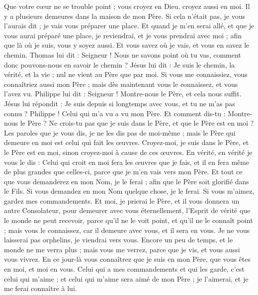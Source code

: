 \begin{multicols}{2}
\VerseOne{}Que votre cœur ne se trouble point ; vous croyez en Dieu, croyez aussi en moi.
Il y a plusieurs demeures dans la maison de mon Père. Si cela n'était pas, je vous l'aurais dit ; je vais vous préparer une place.
Et quand je m'en serai allé, et que je vous aurai préparé une place, je reviendrai, et je vous prendrai avec moi ; afin que là où je suis, vous y soyez aussi.
Et vous savez où je vais, et vous en savez le chemin.
Thomas lui dit : Seigneur ! Nous ne savons point où tu vas, comment donc pouvons-nous en savoir le chemin ?
Jésus lui dit : Je suis le chemin, la vérité, et la vie ; nul ne vient au Père que par moi.
Si vous me connaissiez, vous connaîtriez aussi mon Père ; mais dès maintenant vous le connaissez, et vous l'avez vu.
Philippe lui dit : Seigneur ! Montre-nous le Père, et cela nous suffit.
Jésus lui répondit : Je suis depuis si longtemps avec vous, et tu ne m'as pas connu ? Philippe ! Celui qui m'a vu a vu mon Père. Et comment dis-tu : Montre-nous le Père ?
Ne crois-tu pas que je suis dans le Père, et que le Père est en moi ? Les paroles que je vous dis, je ne les dis pas de moi-même ; mais le Père qui demeure en moi est celui qui fait les œuvres.
Croyez-moi, je suis dans le Père, et le Père est en moi, sinon croyez-moi à cause de ces œuvres.
En vérité, en vérité je vous le dis : Celui qui croit en moi fera les œuvres que je fais, et il en fera même de plus grandes que celles-ci, parce que je m'en vais vers mon Père.
Et tout ce que vous demanderez en mon Nom, je le ferai ; afin que le Père soit glorifié dans le Fils.
Si vous demandez en mon Nom quelque chose, je le ferai.
Si vous m'aimez, gardez mes commandements.
Et moi, je prierai le Père, et il vous donnera un autre Consolateur, pour demeurer avec vous éternellement,
l'Esprit de vérité que le monde ne peut recevoir, parce qu'il ne le voit point, et qu'il ne le connaît point ; mais vous le connaissez, car il demeure avec vous, et il sera en vous.
Je ne vous laisserai pas orphelins, je viendrai vers vous.
Encore un peu de temps, et le monde ne me verra plus ; mais vous me verrez, parce que je vis, et vous aussi vous vivrez.
En ce jour-là vous connaîtrez que je suis en mon Père, que vous êtes en moi, et moi en vous.
Celui qui a mes commandements et qui les garde, c'est celui qui m'aime ; et celui qui m'aime sera aimé de mon Père ; je l'aimerai, et je me ferai connaître à lui.

\end{multicols}
